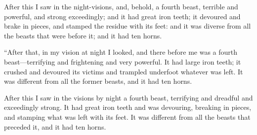			\begin{versebox}
					\item[BHS] 
					\item[LXX] 
					\item[ASV] After this I saw in the night-visions, and, behold, a fourth beast, terrible and powerful, and strong exceedingly; and it had great iron teeth; it devoured and brake in pieces, and stamped the residue with its feet: and it was diverse from all the beasts that were before it; and it had ten horns.
					\item[NIV] “After that, in my vision at night I looked, and there before me was a fourth beast—terrifying and frightening and very powerful. It had large iron teeth; it crushed and devoured its victims and trampled underfoot whatever was left. It was different from all the former beasts, and it had ten horns.
					\item[NRSV] After this I saw in the visions by night a fourth beast, terrifying and dreadful and exceedingly strong. It had great iron teeth and was devouring, breaking in pieces, and stamping what was left with its feet. It was different from all the beasts that preceded it, and it had ten horns.
			\end{versebox}

